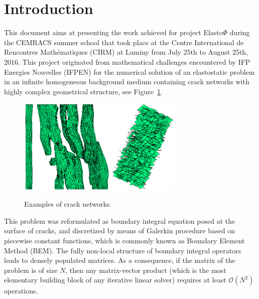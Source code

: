 

\section*{Introduction}

This document aims at presenting the work achieved for project Elasto$\Phi$ during the CEMRACS summer school  
that took place at the Centre International de Rencontres Math\'ematiques (CIRM) at Luminy from July 25th to 
August 25th, 2016. This project originated from mathematical challenges encountered by IFP Energies Nouvelles (IFPEN)
for the numerical solution of an elastostatic problem in an infinite homogeneous background medium containing crack 
networks with highly complex geometrical structure, see Figure~\ref{fig:structureExamples}. 

\begin{figure}[hb]
\centering
\includegraphics[width=0.4\textwidth]{../images/visu_maillage5364FracsTriangles.png} \quad
\includegraphics[width=0.3\textwidth]{../images/visu_maillage1994Fracs.png}
\caption{Examples of crack networks.}
\label{fig:structureExamples}
\end{figure}

\bigskip
This problem was reformulated as boundary integral equation posed at the surface of cracks, and 
discretized by means of Galerkin procedure based on piecewise constant functions, which is commonly known as 
Boundary Element Method (BEM). The fully non-local structure of boundary integral operators leads to  
densely populated matrices. As a consequence, if the matrix of the problem is of size $N$, 
then any matrix-vector product (which is the most elementary building block of any iterative linear solver)
requires at least $\mathcal{O}(N^{2})$ operations.

